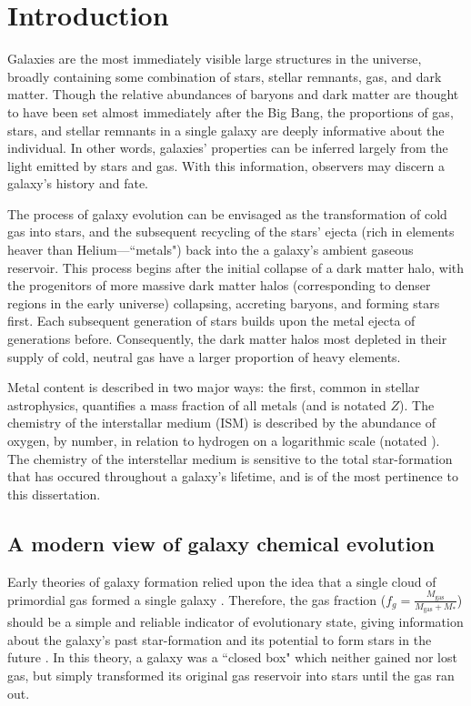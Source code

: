 \graphicspath{{Chapter0-Introduction/}}
\chapter{Introduction}
\label{chap0:intro}

Galaxies are the most immediately visible large structures in the universe, broadly containing some combination of stars, stellar remnants, gas, and dark matter. Though the relative abundances of baryons and dark matter are thought to have been set almost immediately after the Big Bang, the proportions of gas, stars, and stellar remnants in a single galaxy are deeply informative about the individual. In other words, galaxies' properties can be inferred largely from the light emitted by stars and gas. With this information, observers may discern a galaxy's history and fate.

The process of galaxy evolution can be envisaged as the transformation of cold gas into stars, and the subsequent recycling of the stars' ejecta (rich in elements heaver than Helium---``metals") back into the a galaxy's ambient gaseous reservoir. This process begins after the initial collapse of a dark matter halo, with the progenitors of more massive dark matter halos (corresponding to denser regions in the early universe) collapsing, accreting baryons, and forming stars first. Each subsequent generation of stars builds upon the metal ejecta of generations before. Consequently, the dark matter halos most depleted in their supply of cold, neutral gas have a larger proportion of heavy elements. 

Metal content is described in two major ways: the first, common in stellar astrophysics, quantifies a mass fraction of all metals (and is notated $Z$). The chemistry of the interstallar medium (ISM) is described by the abundance of oxygen, by number, in relation to hydrogen on a logarithmic scale (notated \OonH). The chemistry of the interstellar medium is sensitive to the total star-formation that has occured throughout a galaxy's lifetime, and is of the most pertinence to this dissertation.

\section{A modern view of galaxy chemical evolution}

Early theories of galaxy formation relied upon the idea that a single cloud of primordial gas formed a single galaxy \citep{eggen_62}. Therefore, the gas fraction ($f_g = \frac{M_{\textrm{gas}}}{M_{\textrm{gas}} + M_*}$) should be a simple and reliable indicator of evolutionary state, giving information about the galaxy's past star-formation and its potential to form stars in the future \citep{tinsley_80_chemev,pei_fall_95}. In this theory, a galaxy was a ``closed box" which neither gained nor lost gas, but simply transformed its original gas reservoir into stars until the gas ran out.


